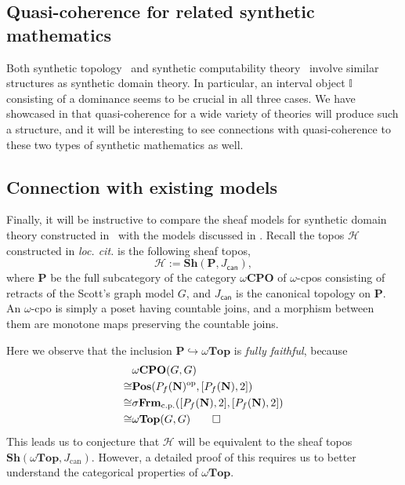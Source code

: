\documentclass[12pt]{amsart}
\theoremstyle{definition}
\newcommand{\mc}[1]{\mathcal{#1}}
\newcommand{\mb}[1]{\mathbf{#1}}
\newcommand{\mbb}[1]{\mathbb{#1}}
\newcommand{\I}{\mbb I}
\newcommand{\mr}[1]{\mathrm{#1}}
\newcommand{\ms}[1]{\mathsf{#1}}
\newcommand{\Pos}{\mb{Pos}}
\newcommand{\sh}{\mb{Sh}}
\newcommand{\op}{^{\mathrm{op}}}
\newcommand{\hook}{\hookrightarrow}
\newcommand{\cp}{_{\mr{c.p.}}}
\newcommand{\N}{\mb N}
\newcommand{\wCPO}{\omega\mb{CPO}}
\newcommand{\sFrm}{\sigma\mb{Frm}}
\newcommand{\wTop}{\omega\mb{Top}}
\begin{document}

\subsection{Quasi-coherence for related synthetic mathematics}

Both synthetic topology~\cite{bauer2009dedekind} and synthetic computability theory~\cite{RN552} involve similar structures as synthetic domain theory. In particular, an interval object $\I$ consisting of a dominance seems to be crucial in all three cases. We have showcased in  that quasi-coherence for a wide variety of theories will produce such a structure, and it will be interesting to see connections with quasi-coherence to these two types of synthetic mathematics as well.

\subsection{Connection with existing models}\label{subsec:compare}

Finally, it will be instructive to compare the sheaf models for synthetic domain theory constructed in~\cite{FIORE1997151} with the models discussed in . Recall the topos $\mc H$ constructed in \emph{loc. cit.} is the following sheaf topos,
\[ \mc H := \sh(\mb P,J_{\ms{can}}), \]
where $\mb P$ be the full subcategory of the category $\wCPO$ of $\omega$-cpos consisting of retracts of the Scott's graph model $G$, and $J_{\ms{can}}$ is the canonical topology on $\mb P$. An $\omega$-cpo is simply a poset having countable joins, and a morphism between them are monotone maps preserving the countable joins.

Here we observe that the inclusion $\mb P \hook \wTop$ is \emph{fully faithful}, because
\begin{align*}
  &\wCPO(G,G) \\
  \cong& \Pos(P_f(\N)\op,[P_f(\N),2]) \\
  \cong& \sFrm\cp([P_f(\N),2],[P_f(\N),2]) \\ 
  \cong& \wTop(G,G) \qedhere
\end{align*}
This leads us to conjecture that $\mc H$ will be equivalent to the sheaf topos $\sh(\wTop,J_{\mr{can}})$. However, a detailed proof of this requires us to better understand the categorical properties of $\wTop$.
\end{document}
